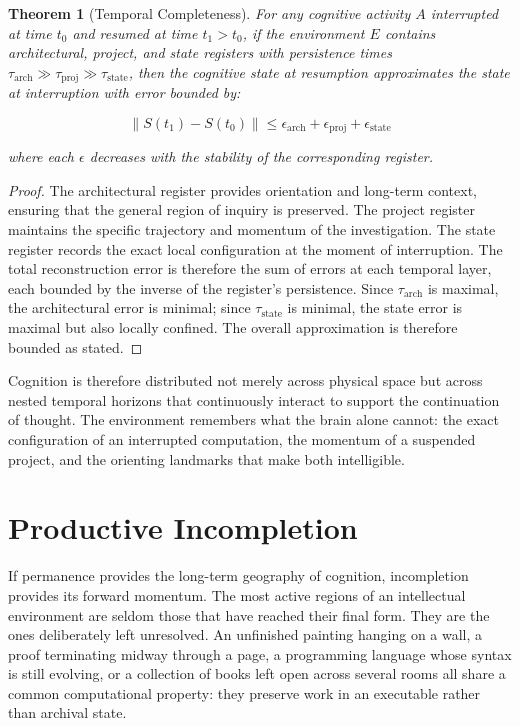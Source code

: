 \documentclass[12pt,oneside]{article}
\newtheorem{theorem}[definition]{Theorem}
\theoremstyle{remark}
\begin{document}
\begin{theorem}[Temporal Completeness]
For any cognitive activity $A$ interrupted at time $t_0$ and resumed at time $t_1 > t_0$, if the environment $E$ contains architectural, project, and state registers with persistence times $\tau_{\text{arch}} \gg \tau_{\text{proj}} \gg \tau_{\text{state}}$, then the cognitive state at resumption approximates the state at interruption with error bounded by:

\begin{equation}
\|S(t_1) - S(t_0)\| \leq \epsilon_{\text{arch}} + \epsilon_{\text{proj}} + \epsilon_{\text{state}}
\end{equation}

where each $\epsilon$ decreases with the stability of the corresponding register.
\end{theorem}

\begin{proof}
The architectural register provides orientation and long-term context, ensuring that the general region of inquiry is preserved. The project register maintains the specific trajectory and momentum of the investigation. The state register records the exact local configuration at the moment of interruption. The total reconstruction error is therefore the sum of errors at each temporal layer, each bounded by the inverse of the register's persistence. Since $\tau_{\text{arch}}$ is maximal, the architectural error is minimal; since $\tau_{\text{state}}$ is minimal, the state error is maximal but also locally confined. The overall approximation is therefore bounded as stated.
\end{proof}

Cognition is therefore distributed not merely across physical space but across nested temporal horizons that continuously interact to support the continuation of thought. The environment remembers what the brain alone cannot: the exact configuration of an interrupted computation, the momentum of a suspended project, and the orienting landmarks that make both intelligible.


\section{Productive Incompletion}

If permanence provides the long-term geography of cognition, incompletion provides its forward momentum. The most active regions of an intellectual environment are seldom those that have reached their final form. They are the ones deliberately left unresolved. An unfinished painting hanging on a wall, a proof terminating midway through a page, a programming language whose syntax is still evolving, or a collection of books left open across several rooms all share a common computational property: they preserve work in an executable rather than archival state.
\end{document}
